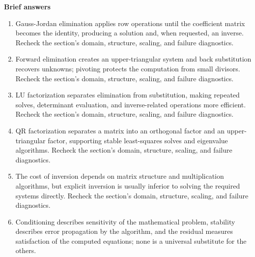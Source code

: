 \documentclass[10pt,letterpaper]{article}
\begin{document}
\textbf{Brief answers}
\begin{enumerate}
\item Gauss-Jordan elimination applies row operations until the coefficient matrix becomes the identity, producing a solution and, when requested, an inverse. Recheck the section's domain, structure, scaling, and failure diagnostics.
\item Forward elimination creates an upper-triangular system and back substitution recovers unknowns; pivoting protects the computation from small divisors. Recheck the section's domain, structure, scaling, and failure diagnostics.
\item LU factorization separates elimination from substitution, making repeated solves, determinant evaluation, and inverse-related operations more efficient. Recheck the section's domain, structure, scaling, and failure diagnostics.
\item QR factorization separates a matrix into an orthogonal factor and an upper-triangular factor, supporting stable least-squares solves and eigenvalue algorithms. Recheck the section's domain, structure, scaling, and failure diagnostics.
\item The cost of inversion depends on matrix structure and multiplication algorithms, but explicit inversion is usually inferior to solving the required systems directly. Recheck the section's domain, structure, scaling, and failure diagnostics.
\item Conditioning describes sensitivity of the mathematical problem, stability describes error propagation by the algorithm, and the residual measures satisfaction of the computed equations; none is a universal substitute for the others.
\end{enumerate}
\end{document}
